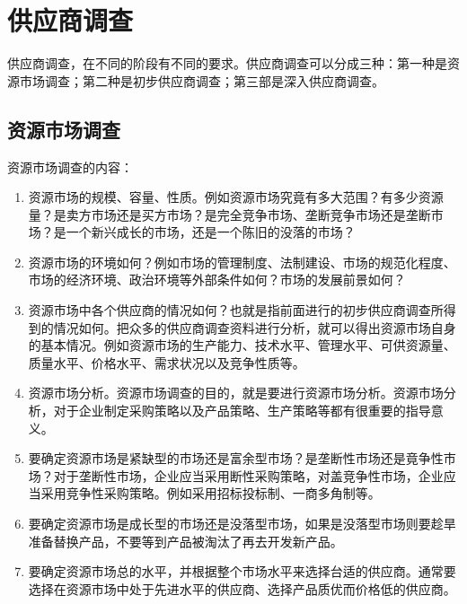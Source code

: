 \section {供应商调查}

    供应商调查，在不同的阶段有不同的要求。供应商调查可以分成三种：第一种是资源市场调查；第二种是初步供应商调查；第三部是深入供应商调查。

\subsection {资源市场调查}

    资源市场调查的内容：
    \begin{enumerate}

        \item  资源市场的规模、容量、性质。例如资源市场究竟有多大范围？有多少资源量？是卖方市场还是买方市场？是完全竞争市场、垄断竞争市场还是垄断市场？是一个新兴成长的市场，还是一个陈旧的没落的市场？

        \item  资源市场的环境如何？例如市场的管理制度、法制建设、市场的规范化程度、市场的经济环境、政治环境等外部条件如何？市场的发展前景如何？

        \item  资源市场中各个供应商的情况如何？也就是指前面进行的初步供应商调查所得到的情况如何。把众多的供应商调查资料进行分析，就可以得出资源市场自身的基本情况。例如资源市场的生产能力、技术水平、管理水平、可供资源量、质量水平、价格水平、需求状况以及竞争性质等。

        \item 资源市场分析。资源市场调查的目的，就是要进行资源市场分析。资源市场分析，对于企业制定采购策略以及产品策略、生产策略等都有很重要的指导意义。

        \item  要确定资源市场是紧缺型的市场还是富余型市场？是垄断性市场还是竟争性市场？对于垄断性市场，企业应当采用断性采购策略，对盖竞争性市场，企业应当采用竞争性采购策略。例如采用招标投标制、一商多角制等。

        \item  要确定资源市场是成长型的市场还是没落型市场，如果是没落型市场则要趁旱准备替换产品，不要等到产品被淘汰了再去开发新产品。

        \item  要确定资源市场总的水平，并根据整个市场水平来选择台适的供应商。通常要选择在资源市场中处于先进水平的供应商、选择产品质优而价格低的供应商。

    \end{enumerate}

